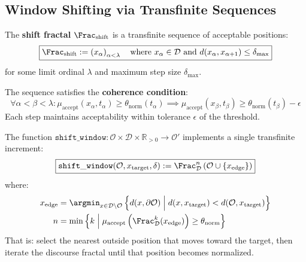 \subsection{Window Shifting via Transfinite Sequences}

\begin{definition}
\label{def:shift-fractal}
The \textbf{shift fractal} $\Frac_{\mathrm{shift}}$ is a transfinite sequence of
acceptable positions:
\[
\boxed{
    \Frac_{\mathrm{shift}} := \left( x_\alpha \right)_{\alpha < \lambda}
    \quad \text{where } x_\alpha \in \mathcal{D} \text{ and }
    d(x_\alpha, x_{\alpha+1}) \leq \delta_{\max}
}
\]
for some limit ordinal $\lambda$ and maximum step size $\delta_{\max}$.

The sequence satisfies the \textbf{coherence condition}:
\[
    \forall \alpha < \beta < \lambda :
    \mu_{\mathrm{accept}}(x_\alpha, t_\alpha) \geq \theta_{\mathrm{norm}}(t_\alpha)
    \implies \mu_{\mathrm{accept}}(x_\beta, t_\beta) \geq \theta_{\mathrm{norm}}(t_\beta) - \epsilon
\]
Each step maintains acceptability within tolerance $\epsilon$ of the threshold.
\end{definition}

\begin{definition}
\label{def:shift-window}
The function $\mathtt{shift\_window} : \mathcal{O} \times \mathcal{D} \times
\mathbb{R}_{>0} \to \mathcal{O}'$ implements a single transfinite increment:
\[
\boxed{
    \mathtt{shift\_window}(\mathcal{O}, x_{\mathrm{target}}, \delta) :=
    \Frac_{\mathcal{D}}^n\left( \mathcal{O} \cup \{x_{\mathrm{edge}}\} \right)
}
\]
where:
\begin{align}
    x_{\mathrm{edge}} &= \argmin_{x \in \mathcal{D} \setminus \mathcal{O}}
        \left\{ d(x, \partial\mathcal{O}) \;\Big|\;
        d(x, x_{\mathrm{target}}) < d(\mathcal{O}, x_{\mathrm{target}}) \right\} \\
    n &= \min\left\{ k \;\Big|\;
        \mu_{\mathrm{accept}}\left(\Frac_{\mathcal{D}}^k(x_{\mathrm{edge}})\right)
        \geq \theta_{\mathrm{norm}} \right\}
\end{align}
That is: select the nearest outside position that moves toward the target, then
iterate the discourse fractal until that position becomes normalized.
\end{definition}

